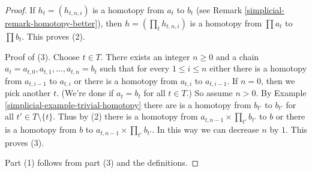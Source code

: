\begin{proof}

If $h_t = (h_{t, n , i})$ is a homotopy from $a_t$ to $b_t$
(see Remark \ref{simplicial-remark-homotopy-better}), then
$h = (\prod_t h_{t, n, i})$ is a homotopy from $\prod a_t$ to $\prod b_t$.
This proves (2).

\medskip\noindent
Proof of (3). Choose $t \in T$. There exists an integer $n \geq 0$
and a chain $a_t = a_{t, 0}, a_{t, 1}, \ldots, a_{t, n} = b_t$ such that
for every $1 \leq i \leq n$ either there is a homotopy from
$a_{t, i - 1}$ to $a_{t, i}$ or there is a homotopy from
$a_{t, i}$ to $a_{t, i - 1}$. If $n = 0$, then we pick another $t$.
(We're done if $a_t = b_t$ for all $t \in T$.) So assume $n > 0$.
By Example \ref{simplicial-example-trivial-homotopy}
there are is a homotopy from $b_{t'}$ to $b_{t'}$ for all
$t' \in T \setminus \{t\}$. Thus by (2) there is a homotopy from
$a_{t, n - 1} \times \prod_{t'} b_{t'}$ to $b$ or there is a
homotopy from $b$ to $a_{t, n - 1} \times \prod_{t'} b_{t'}$.
In this way we can decrease $n$ by $1$. This proves (3).

\medskip\noindent
Part (1) follows from part (3) and the definitions.
\end{proof}

